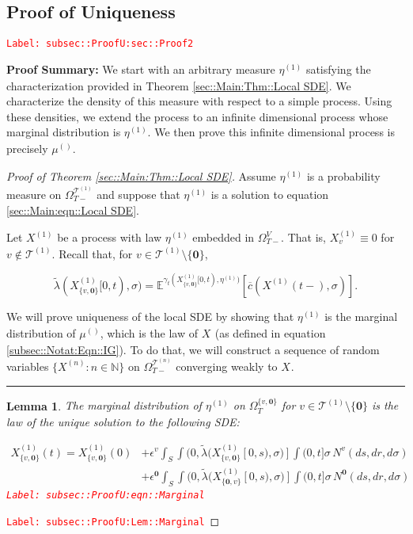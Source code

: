 \documentclass[12pt]{article}
\newcommand{\mb}{\mathbb}
\newcommand{\mc}{\mathcal}
\newcommand{\ov}{\overline}
\newcommand{\ep}{\epsilon}
\newcommand{\tr}{\textcolor{red}}
\newcommand{\labe}[1]{\tr{\texttt{Label: #1}}}
\newcommand{\pfsum}{\textbf{Proof Summary: }}
\newcommand{\ind}{\hspace{24pt}}
\newcommand{\lin}{\rule{\linewidth}{0.4 pt}}
\newcommand{\exmu}[2]{\mb{E}^{#1}\left[#2\right]}	%
\renewcommand{\root}{\mathbf{0}}				%
\renewcommand{\v}{v}							%
\renewcommand{\S}{S}							%
\newcommand{\s}{\sigma}							%
\newcommand{\ev}{\ep}							%
\newcommand{\T}{T}								%
\renewcommand{\t}{t}							%
\newcommand{\sset}{\Omega}						%
\renewcommand{\tt}{s}							%
\newcommand{\X}{X}								%
\newcommand{\vind}[1]{^{#1}}					%
\newcommand{\vsi}[1]{^{#1}}						%
\newcommand{\cind}[1]{_{#1}}					%
\newcommand{\tp}[1]{(#1)}						%
\newcommand{\tip}[1]{#1}						%
\newcommand{\ts}[1]{_{#1}}						%
\newcommand{\IGrg}{\ov{c}}						%
\newcommand{\tree}{\mc{T}}						%
\newcommand{\sln}[1]{^{(#1)}}					%
\newcommand{\poiss}{N}							%
\renewcommand{\r}{r}							%
\newcommand{\alt}[1]{\widetilde{#1}}			%
\newcommand{\m}{\mu}							%
\newcommand{\mmm}{\eta}							%
\newcommand{\cm}{\gamma}						%
\newcommand{\crate}{\alt{\lambda}}				%
\newtheorem{lem}[thms]{Lemma}
\begin{document}
\subsection{Proof of Uniqueness}
\label{subsec::ProofU:sec::Proof2}\labe{subsec::ProofU:sec::Proof2}

\pfsum We start with an arbitrary measure \(\mmm\sln{1}\ts{}\) satisfying the characterization provided in Theorem \ref{sec::Main:Thm::Local SDE}. We characterize the density of this measure with respect to a simple process. Using these densities, we extend the process to an infinite dimensional process whose marginal distribution is \(\mmm\sln{1}\ts{}\). We then prove this infinite dimensional process is precisely \(\m\sln{}\ts{}\).

\begin{proof}[Proof of Theorem \ref{sec::Main:Thm::Local SDE}]

Assume \(\mmm\sln{1}\ts{}\) is a probability measure on \(\sset\vsi{\tree\sln{1}}\ts{\T-}\) and suppose that \(\mmm\sln{1}\ts{}\) is a solution to equation \eqref{sec::Main:eqn::Local SDE}.

\ind Let \(\X\sln{1}\cind{}\tip{}\) be a process with law \(\mmm\sln{1}\ts{}\) embedded in \(\sset\vsi{V}\ts{\T-}\). That is, \(\X\sln{1}\cind{\v}\tip{} \equiv 0\) for \(\v \notin \tree\sln{1}\). Recall that, for \(\v \in \tree\sln{1}\setminus\{\root\}\),

\[\crate{}{}(\X\sln{1}\cind{\{\v,\root\}}\tip{[0,\t)},\s) = \exmu{\cm\ts{\t}(\X\sln{1}\cind{\{\v,\root\}}\tip{[0,\t)},\mmm\sln{1}\ts{})}{\IGrg{}(\X\sln{1}\cind{}\tp{\t-},\s)}.\]

\ind We will prove uniqueness of the local SDE by showing that \(\mmm\sln{1}\ts{}\) is the marginal distribution of \(\m\sln{}\ts{}\), which is the law of \(\X\cind{}\tip{}\) (as defined in equation \eqref{subsec::Notat:Eqn::IG}). To do that, we will construct a sequence of random variables \(\{\X\sln{n}\cind{}\tip{}:n\in\mb{N}\}\) on \(\sset\vsi{\tree\sln{n}}\ts{\T-}\) converging weakly to \(\X\cind{}\tip{}\). 

\lin

\begin{lem}
The marginal distribution of \(\mmm\sln{1}\ts{}\) on \(\sset\vsi{\{\v,\root\}}\ts{\T}\) for \(\v \in \tree\sln{1}\setminus\{\root\}\) is the law of the unique solution to the following SDE:

\begin{align}
\X\sln{1}\cind{\{\v,\root\}}\tp{\t} = \X\sln{1}\cind{\{\v,\root\}}\tp{0} &+ \ev\vind{\v}\int_\S\int{(0,\crate{}{}(\X\sln{1}\cind{\{\v,\root\}}\tip{[0,\tt)},\s)]}\int{(0,\t]}\s\,\poiss\vind{\v}(d\tt,d\r,d\s)\nonumber\\
&+ \ev\vind{\root}\int_\S\int{(0,\crate{}{}(\X\sln{1}\cind{\{\root,\v\}}\tip{[0,\tt)},\s)]}\int{(0,\t]}\s\,\poiss\vind{\root}(d\tt,d\r,d\s)
\label{subsec::ProofU:eqn::Marginal}
\end{align}
\labe{subsec::ProofU:eqn::Marginal}
\label{subsec::ProofU:Lem::Marginal}
\end{lem}
\labe{subsec::ProofU:Lem::Marginal}


\end{proof}
\end{document}

